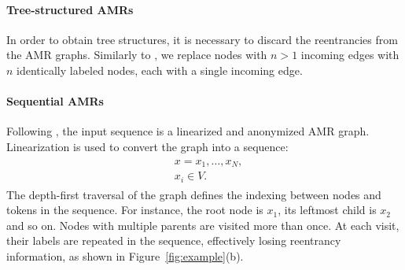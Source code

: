 \documentclass[11pt,a4paper]{article}
\begin{document}
\paragraph{Tree-structured AMRs} 
In order to obtain tree structures, it is necessary to discard the reentrancies from the AMR graphs. 
Similarly to , we replace nodes with $n > 1$ incoming edges with $n$ identically labeled nodes, each with a single incoming edge.


\paragraph{Sequential AMRs} Following , the input sequence is a linearized and anonymized AMR graph. Linearization is used to convert the graph into a sequence:
\begin{align*}
\begin{split}
& x = x_1, \dots, x_N, \\
& x_i \in V.
\end{split}
\end{align*}
The depth-first traversal of the graph defines the indexing between nodes and tokens in the sequence. For instance, the root node is $x_1$, its leftmost child is $x_2$ and so on. 
Nodes with multiple parents are visited more than once. At each visit, their labels are repeated in the sequence, effectively losing reentrancy information, as shown in Figure~\ref{fig:example}(b).
\end{document}
